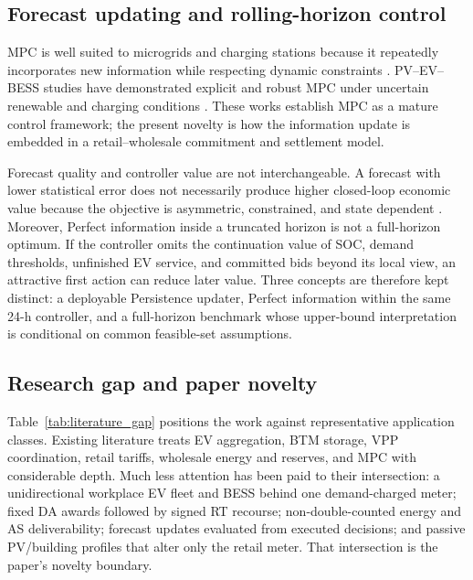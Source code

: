 \documentclass[final,5p,times]{elsarticle}
\begin{document}
\subsection{Forecast updating and rolling-horizon control}
MPC is well suited to microgrids and charging stations because it repeatedly incorporates new information while respecting dynamic constraints \cite{parisio2014model} \cite{rawlings2017mpc} \cite{hermans2024implementation} \cite{klemets2024charging}. PV--EV--BESS studies have demonstrated explicit and robust MPC under uncertain renewable and charging conditions \cite{cabrera2022realtime} \cite{cabrera2024robust}. These works establish MPC as a mature control framework; the present novelty is how the information update is embedded in a retail--wholesale commitment and settlement model.

Forecast quality and controller value are not interchangeable. A forecast with lower statistical error does not necessarily produce higher closed-loop economic value because the objective is asymmetric, constrained, and state dependent \cite{ludolfinger2025prediction}. Moreover, Perfect information inside a truncated horizon is not a full-horizon optimum. If the controller omits the continuation value of SOC, demand thresholds, unfinished EV service, and committed bids beyond its local view, an attractive first action can reduce later value. Three concepts are therefore kept distinct: a deployable Persistence updater, Perfect information within the same 24-h controller, and a full-horizon benchmark whose upper-bound interpretation is conditional on common feasible-set assumptions.

\subsection{Research gap and paper novelty}
Table~\ref{tab:literature_gap} positions the work against representative application classes. Existing literature treats EV aggregation, BTM storage, VPP coordination, retail tariffs, wholesale energy and reserves, and MPC with considerable depth. Much less attention has been paid to their intersection: a unidirectional workplace EV fleet and BESS behind one demand-charged meter; fixed DA awards followed by signed RT recourse; non-double-counted energy and AS deliverability; forecast updates evaluated from executed decisions; and passive PV/building profiles that alter only the retail meter. That intersection is the paper's novelty boundary.
\end{document}
